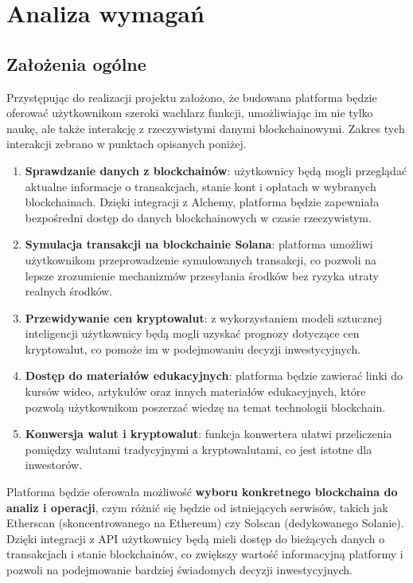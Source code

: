 \chapter{Analiza wymagań}
\section{Założenia ogólne}

Przystępując do realizacji projektu założono, że budowana platforma będzie oferować użytkownikom szeroki wachlarz funkcji, umożliwiając im nie tylko naukę, ale także interakcję z rzeczywistymi danymi blockchainowymi. Zakres tych interakcji zebrano w punktach opisanych poniżej.
\begin{enumerate} 
\item \textbf{Sprawdzanie danych z blockchainów}: użytkownicy będą mogli przeglądać aktualne informacje o transakcjach, stanie kont i opłatach w wybranych blockchainach. Dzięki integracji z Alchemy, platforma będzie zapewniała bezpośredni dostęp do danych blockchainowych w czasie rzeczywistym. 
\item \textbf{Symulacja transakcji na blockchainie Solana}: platforma umożliwi użytkownikom przeprowadzenie symulowanych transakcji, co pozwoli na lepsze zrozumienie mechanizmów przesyłania środków bez ryzyka utraty realnych środków. 
\item \textbf{Przewidywanie cen kryptowalut}: z wykorzystaniem modeli sztucznej inteligencji użytkownicy będą mogli uzyskać prognozy dotyczące cen kryptowalut, co pomoże im w podejmowaniu decyzji inwestycyjnych. 
\item \textbf{Dostęp do materiałów edukacyjnych}: platforma będzie zawierać linki do kursów wideo, artykułów oraz innych materiałów edukacyjnych, które pozwolą użytkownikom poszerzać wiedzę na temat technologii blockchain. 
\item \textbf{Konwersja walut i kryptowalut}: funkcja konwertera ułatwi przeliczenia pomiędzy walutami tradycyjnymi a kryptowalutami, co jest istotne dla inwestorów. 
\end{enumerate}

Platforma będzie oferowała możliwość \textbf{wyboru konkretnego blockchaina do analiz i operacji}, czym różnić się będzie od istniejących serwisów, takich jak Etherscan (skoncentrowanego na Ethereum) czy Solscan (dedykowanego Solanie). Dzięki integracji z API użytkownicy będą mieli dostęp do bieżących danych o transakcjach i stanie blockchainów, co zwiększy wartość informacyjną platformy i pozwoli na podejmowanie bardziej świadomych decyzji inwestycyjnych.

